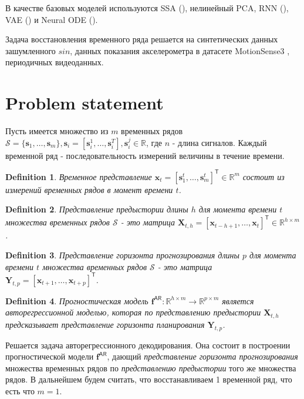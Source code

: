 \documentclass[12pt, twoside]{article}
\newtheorem{definition}{Definition}
\begin{document}
В качестве базовых моделей используются SSA (\citep{golyandina2001analysis}), нелинейный PCA, RNN (\citep{bronstein2021geometric}), VAE (\citep{kingma2019introduction}) и Neural ODE (\citep{chen2018neural}).

Задача восстановления временного ряда решается на синтетических данных зашумленного $sin$, данных показания акселерометра в датасете MotionSense3 \citep{malekzadeh2018protecting}, периодичных видеоданных. 

\section{Problem statement}
Пусть имеется множество из $m$ временных рядов $\mathcal{S}=\{\mathbf{s}_1, \dots, \mathbf{s}_{m}\}, \mathbf{s}_i = [\mathbf{s}_i^1, \dots, \mathbf{s}_i^T], \mathbf{s}_i^j \in \mathbb{R}$, где $n$ - длина сигналов. Каждый временной ряд - последовательность измерений величины в течение времени.

\begin{definition}
Временное представление $\mathbf{x}_t = [\mathbf{s}_1^t, \dots, \mathbf{s}_m^t]^{\mathsf{T}} \in \mathbb{R}^m$ состоит из измерений временных рядов в момент времени $t$.
\end{definition}


\begin{definition}
Представление предыстории длины $h$ для момента времени $t$ множества временных рядов $\mathcal{S}$ - это матрица $\mathbf{X}_{t,h} = [\mathbf{x}_{t-h+1}, \dots, \mathbf{x}_{t}]^{\mathsf{T}} \in \mathbb{R}^{h \times m}$.
\end{definition}

\begin{definition}
Представление горизонта прогнозирования длины $p$ для момента времени $t$ множества временных рядов $\mathcal{S}$ - это матрица $\mathbf{Y}_{t, p} = [\mathbf{x}_{t+1}, \dots, \mathbf{x}_{t+p}]^{\mathsf{T}}$.
\end{definition}

\begin{definition}
Прогностическая модель $\mathbf{f}^{\mathsf{AR}}: \mathbb{R}^{h \times m} \to \mathbb{R}^{p \times m}$ является авторегрессионной моделью, которая по представлению предыстории $\mathbf{X}_{t, h}$ предсказывает представление горизонта планирования $\mathbf{Y}_{t, p}$.
\end{definition}

Решается задача авторегрессионного декодирования. Она состоит в построении прогностической модели $\mathbf{f}^{\mathsf{AR}}$, дающий \textit{представление горизонта прогнозирования} множества временных рядов по \textit{представлению предыстории} того же множества рядов. В дальнейшем будем считать, что восстанавливаем 1 временной ряд, что есть что $m=1$.
\end{document}
